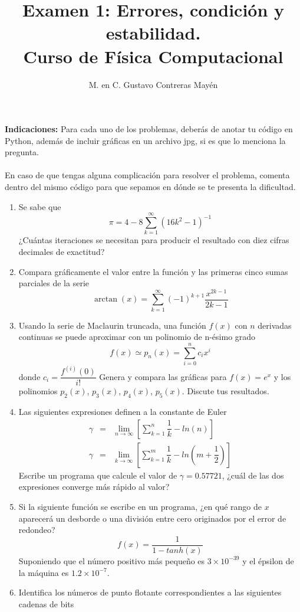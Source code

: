 \documentclass[11pt]{article}
\title{Examen 1: Errores, condición y estabilidad. \\ Curso de Física Computacional}
\author{M. en C. Gustavo Contreras Mayén}
\date{ }
\begin{document}
\maketitle
\fontsize{14}{14}\selectfont
\textbf{Indicaciones: } Para cada uno de los problemas, deber\'{a}s de anotar tu c\'{o}digo en Python, adem\'{a}s de incluir gr\'{a}ficas en un archivo jpg, si es que lo menciona la pregunta.
\\
\\
En caso de que tengas alguna complicaci\'{o}n para resolver el problema, comenta dentro del mismo c\'{o}digo para que sepamos en d\'{o}nde se te presenta la dificultad.
\begin{enumerate}
\item Se sabe que
\[ \pi = 4 - 8 \sum_{k=1}^{\infty} \left( 16 k^{2} - 1 \right)^{-1} \]
¿Cu\'{a}ntas iteraciones se necesitan para producir el resultado con diez cifras decimales de exactitud?
\item Compara gr\'{a}ficamente el valor entre la funci\'{o}n y las primeras cinco sumas parciales de la serie
\[ \arctan(x) = \sum_{k=1}^{\infty} (-1)^{k+1} \dfrac{x^{2k-1}}{2k-1}\]
\item Usando la serie de Maclaurin truncada, una función $f(x)$ con $n$ derivadas continuas se puede aproximar con un polinomio de n-\'{e}simo grado
\[ f(x) \simeq p_{n}(x) = \sum_{i=0}^{n} c_{i} x^{i} \]
donde $c_{i} = \dfrac{f^{(i)}(0)}{i!}$
Genera y compara las gr\'{a}ficas para $f(x)= e^{x}$ y los polinomios $p_{2}(x)$, $p_{3}(x)$, $p_{4}(x)$, $p_{5}(x)$. Discute tus resultados.
\item Las siguientes expresiones definen a la constante de Euler
\begin{eqnarray}
\gamma &=& \lim_{n \rightarrow \infty} \left[ \sum_{k=1}^{n} \dfrac{1}{k} - ln (n) \right] \\
\gamma &=& \lim_{k \rightarrow \infty} \left[ \sum_{k=1}^{m} \dfrac{1}{k} - ln \left( m + \dfrac{1}{2} \right) \right]
\end{eqnarray}
Escribe un programa que calcule el valor de $\gamma = 0.57721$, ¿cu\'{a}l de las dos expresiones converge m\'{a}s r\'{a}pido al valor?
\item Si la siguiente funci\'{o}n se escribe en un programa, ¿en qu\'{e} rango de $x$ aparecer\'{a} un desborde o una divisi\'{o}n entre cero originados por el error de redondeo?
\[ f(x)=\dfrac{1}{1-tanh(x)} \]
Suponiendo que el n\'{u}mero positivo m\'{a}s pequeño es $3 \times 10^{-39}$  y el \'{e}psilon de la m\'{a}quina es $1.2 \times 10^{-7}$.
\item Identifica los n\'{u}meros de punto flotante correspondientes a las siguientes cadenas de bits

\end{enumerate}
\end{document}
